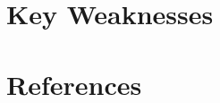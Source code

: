 \documentclass[a4paper]{article}
\begin{document}
\section{Key Weaknesses} %


\section{References} %

\end{document}
